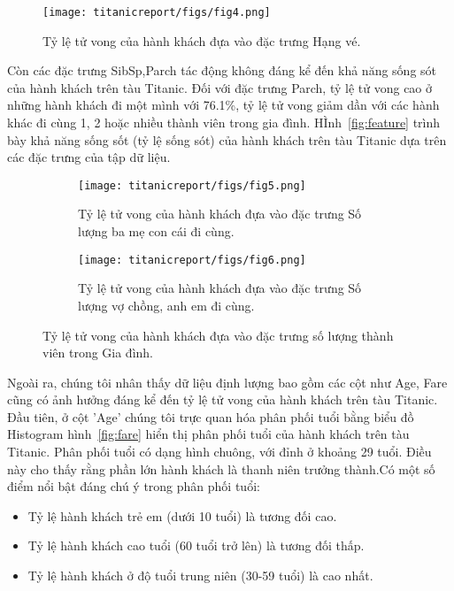 \documentclass[11pt]{article}
\begin{document}
\begin{figure}[ht]
    \centering
    \texttt{[image: titanicreport/figs/fig4.png]}
    \caption{Tỷ lệ tử vong của hành khách đựa vào đặc trưng Hạng vé.}
 
\end{figure}
Còn các đặc trưng SibSp,Parch tác động không đáng kể đến khả năng sống sót của hành khách trên tàu Titanic. Đối với đặc trưng Parch, tỷ lệ tử vong cao ở những hành khách đi một mình với 76.1\%, tỷ lệ tử vong giảm dần với các hành khác đi cùng 1, 2 hoặc nhiều thành viên trong gia đình.  HÌnh~\ref{fig:feature} trình bày khả năng sống sốt (tỷ lệ sống sót) của hành khách trên tàu Titanic dựa trên các đặc trưng của tập dữ liệu.\\
\begin{figure}[t]
    \centering
    \begin{subfigure}{0.48\textwidth}
        \centering
        \texttt{[image: titanicreport/figs/fig5.png]}
        \caption{Tỷ lệ tử vong của hành khách đựa vào đặc trưng Số lượng ba mẹ con cái đi cùng.}
        
    \end{subfigure}
    \hfill
    \begin{subfigure}{0.48\textwidth}
        \centering
        \texttt{[image: titanicreport/figs/fig6.png]}
        \caption{Tỷ lệ tử vong của hành khách đựa vào đặc trưng Số lượng vợ chồng, anh em đi cùng.}
      
    \end{subfigure}
    \caption{Tỷ lệ tử vong của hành khách đựa vào đặc trưng số lượng thành viên trong Gia đình.}
\end{figure}
Ngoài ra, chúng tôi nhân thấy dữ liệu định lượng bao gồm các cột như Age, Fare cũng có ảnh hưởng đáng kể đến tỷ lệ tử vong của hành khách trên tàu Titanic. Đầu tiên, ở cột 'Age' chúng tôi trực quan hóa phân phối tuổi bằng biểu đồ Histogram  hình~\ref{fig:fare} hiển thị phân phối tuổi của hành khách trên tàu Titanic. Phân phối tuổi có dạng hình chuông, với đỉnh ở khoảng 29 tuổi. Điều này cho thấy rằng phần lớn hành khách là thanh niên trưởng thành.Có một số điểm nổi bật đáng chú ý trong phân phối tuổi:\\
\begin{itemize}
    \item Tỷ lệ hành khách trẻ em (dưới 10 tuổi) là tương đối cao.
    \item Tỷ lệ hành khách cao tuổi (60 tuổi trở lên) là tương đối thấp.
    \item Tỷ lệ hành khách ở độ tuổi trung niên (30-59 tuổi) là cao nhất.
\end{itemize}
\end{document}
